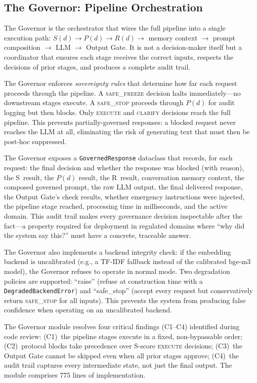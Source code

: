 \documentclass[11pt,a4paper]{article}
\begin{document}
\subsection{The Governor: Pipeline Orchestration}
\label{sec:governor}

The Governor is the orchestrator that wires the full pipeline into a single execution path: $S(d) \to P(d) \to R(d) \to$ memory context $\to$ prompt composition $\to$ LLM $\to$ Output Gate. It is not a decision-maker itself but a coordinator that ensures each stage receives the correct inputs, respects the decisions of prior stages, and produces a complete audit trail.

The Governor enforces \emph{sovereignty rules} that determine how far each request proceeds through the pipeline. A \textsc{safe\_freeze} decision halts immediately---no downstream stages execute. A \textsc{safe\_stop} proceeds through $P(d)$ for audit logging but then blocks. Only \textsc{execute} and \textsc{clarify} decisions reach the full pipeline. This prevents partially-governed responses: a blocked request never reaches the LLM at all, eliminating the risk of generating text that must then be post-hoc suppressed.

The Governor exposes a \texttt{GovernedResponse} dataclass that records, for each request: the final decision and whether the response was blocked (with reason), the S~result, the $P(d)$ result, the R~result, conversation memory context, the composed governed prompt, the raw LLM output, the final delivered response, the Output Gate's check results, whether emergency instructions were injected, the pipeline stage reached, processing time in milliseconds, and the active domain. This audit trail makes every governance decision inspectable after the fact---a property required for deployment in regulated domains where ``why did the system say this?'' must have a concrete, traceable answer.

The Governor also implements a backend integrity check: if the embedding backend is uncalibrated (e.g., a TF-IDF fallback instead of the calibrated bge-m3 model), the Governor refuses to operate in normal mode. Two degradation policies are supported: ``raise'' (refuse at construction time with a \texttt{DegradedBackendError}) and ``safe\_stop'' (accept every request but conservatively return \textsc{safe\_stop} for all inputs). This prevents the system from producing false confidence when operating on an uncalibrated backend.

The Governor module resolves four critical findings (C1--C4) identified during code review: (C1)~the pipeline stages execute in a fixed, non-bypassable order; (C2)~protocol blocks take precedence over S-score \textsc{execute} decisions; (C3)~the Output Gate cannot be skipped even when all prior stages approve; (C4)~the audit trail captures every intermediate state, not just the final output. The module comprises 775 lines of implementation.
\end{document}
